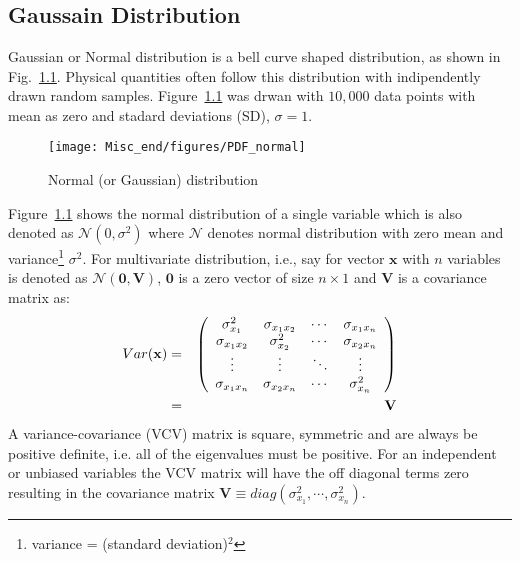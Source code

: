 \chapter[]{}
\label{appendix_b}
\section{Gaussain Distribution}
\label{app:PDF}
Gaussian or Normal distribution is a bell curve shaped distribution, as shown in Fig.~\ref{fig:PDF_normal}. Physical quantities often follow this distribution with indipendently drawn random samples. Figure~\ref{fig:PDF_normal} was drwan with $10,000$ data points with mean as zero and stadard deviations (SD), $\sigma=1$.\\

\begin{figure}[b!]
\begin{center}
\texttt{[image: Misc\_end/figures/PDF\_normal]}
\caption{Normal (or Gaussian) distribution}
\label{fig:PDF_normal}
\end{center}
\end{figure}
\noindent Figure~\ref{fig:PDF_normal} shows the normal distribution of a single variable which is also denoted as $\mathcal{N}(0,\sigma^2)$ where $\mathcal{N}$ denotes normal distribution with zero mean and variance\footnote[1]{variance = \text(standard deviation)$^2$}  $\sigma^2$. For multivariate distribution, i.e., say for vector $\mathbf{x}$ with $n$ variables is denoted as  $\mathcal{N}(\mathbf{0},\mathbf{V})$, $\mathbf{0}$ is a zero vector of size $n \times 1$ and $\mathbf{V}$ is a covariance matrix as:
\begin{eqnarray*}
Var({\bf x})  & = & \left( \begin{array}{cccc}
\sigma_{x_{1}}^{2} & \sigma_{x_{1}x_{2}} & \cdots & \sigma_{x_{1}x_{n}} \\
\sigma_{x_{1}x_{2}} & \sigma_{x_{2}}^{2} & \cdots & \sigma_{x_{2}x_{n}} \\
\vdots             & \vdots              & \ddots & \vdots \\
\sigma_{x_{1}x_{n}} & \sigma_{x_{2}x_{n}} & \cdots & \sigma_{x_{n}}^{2}
\end{array} \right) \\
  & = & {\bf V} \\
\end{eqnarray*}
A variance-covariance (VCV) matrix 
is square, symmetric and are always be positive definite,  
i.e. all of the eigenvalues must be positive. For an independent or unbiased variables the VCV matrix will have the off diagonal terms zero resulting in the covariance matrix  $\mathbf{V}$$\equiv diag(\sigma_{x_{1}}^{2}, \cdots, \sigma_{x_{n}}^{2})$.
